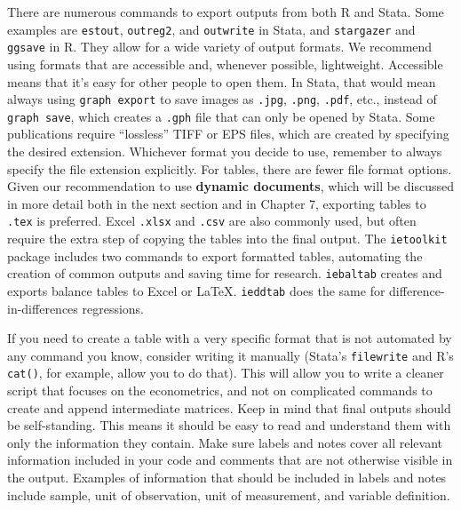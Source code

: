 There are numerous commands to export outputs from both R and Stata.
Some examples are \texttt{estout},\cite{estout05, estout07}
\texttt{outreg2},\cite{wada2014outreg2}
and \texttt{outwrite}\cite{daniels2019outwrite} in Stata,
and \texttt{stargazer}\cite{hlavac2015stargazer}
and \texttt{ggsave} in R.
They allow for a wide variety of output formats. We recommend using formats that are accessible and, whenever possible, lightweight.
Accessible means that it's easy for other people to open them.
In Stata, that would mean always using \texttt{graph export} to save images as
\texttt{.jpg}, \texttt{.png}, \texttt{.pdf}, etc.,
instead of \texttt{graph save},
which creates a \texttt{.gph} file that can only be opened by Stata.
Some publications require ``lossless'' TIFF or EPS files,
which are created by specifying the desired extension.
Whichever format you decide to use,
remember to always specify the file extension explicitly.
For tables, there are fewer file format options.
Given our recommendation to use \textbf{dynamic documents},
which will be discussed in more detail both in the next section and in Chapter 7,
exporting tables to \texttt{.tex} is preferred.
Excel \texttt{.xlsx} and \texttt{.csv} are also commonly used,
but often require the extra step of copying the tables into the final output.
The \texttt{ietoolkit} package includes two commands to export formatted tables,
automating the creation of common outputs and saving time for research.
\texttt{iebaltab}
creates and exports balance tables to Excel or {\LaTeX}.\index{{\LaTeX}}
\texttt{ieddtab}
does the same for difference-in-differences regressions.

If you need to create a table with a very specific format
that is not automated by any command you know, consider writing it manually
(Stata's \texttt{filewrite} and R's \texttt{cat()}, for example, allow you to do that).
This will allow you to write a cleaner script that focuses on the econometrics,
and not on complicated commands to create and append intermediate matrices.
Keep in mind that final outputs should be self-standing.
This means it should be easy to read and understand them with only the information they contain.
Make sure labels and notes cover all relevant information
included in your code and comments that are not otherwise visible in the output.
Examples of information that should be included in labels and notes include sample,
unit of observation, unit of measurement, and variable definition.

